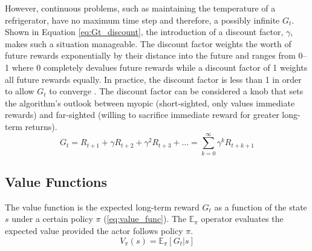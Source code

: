 However, continuous problems, such as maintaining the temperature of a refrigerator, have no maximum time step and therefore, a possibly infinite $G_t$. Shown in Equation \ref{eq:Gt_discount}, the introduction of a discount factor, $\gamma$, makes such a situation manageable. The discount factor weights the worth of future rewards exponentially by their distance into the future and ranges from 0--1 where 0 completely devalues future rewards while a discount factor of 1 weights all future rewards equally. In practice, the discount factor is less than 1 in order to allow $G_t$ to converge \cite{sutton_2017}. The discount factor can be considered a knob that sets the algorithm's outlook between myopic (short-sighted, only values immediate rewards) and far-sighted (willing to sacrifice immediate reward for greater long-term returns).
\begin{equation}
\label{eq:Gt_discount}
	G_t=R_{t+1}+\gamma R_{t+2}+\gamma^2 R_{t+3} + \dots = \sum_{k=0}^{\infty} \gamma^k R_{t+k+1}
\end{equation}

\subsection{Value Functions}
The value function is the expected long-term reward $G_t$ as a function of the state $s$ under a certain policy $\pi$ (\ref{eq:value_func}). The $\mathbb{E}_\pi$ operator evaluates the expected value provided the actor follows policy $\pi$.
\begin{equation}
	\label{eq:value_func}
	V_\pi(s)=\mathbb{E}_\pi [G_t | s]
\end{equation}

